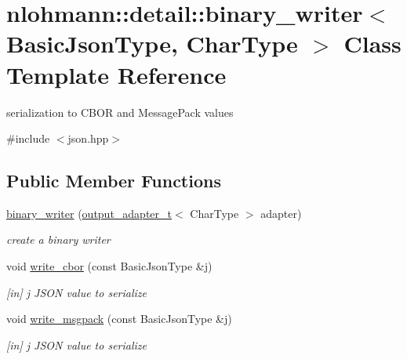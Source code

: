 \hypertarget{classnlohmann_1_1detail_1_1binary__writer}{}\section{nlohmann\+:\+:detail\+:\+:binary\+\_\+writer$<$ Basic\+Json\+Type, Char\+Type $>$ Class Template Reference}
\label{classnlohmann_1_1detail_1_1binary__writer}


serialization to C\+B\+OR and Message\+Pack values  




{\ttfamily \#include $<$json.\+hpp$>$}

\subsection*{Public Member Functions}
\begin{DoxyCompactItemize}
\item 
\hyperlink{classnlohmann_1_1detail_1_1binary__writer_a373289af95a946c19bb4a58a5df71a78}{binary\+\_\+writer} (\hyperlink{namespacenlohmann_1_1detail_a0fd8edff7729aa2dd92b070964bade2e}{output\+\_\+adapter\+\_\+t}$<$ Char\+Type $>$ adapter)
\begin{DoxyCompactList}\small\item\em create a binary writer \end{DoxyCompactList}\item 
void \hyperlink{classnlohmann_1_1detail_1_1binary__writer_aa0ab8d27fd88a33a2f801413ac4c7fbc}{write\+\_\+cbor} (const Basic\+Json\+Type \&j)\hypertarget{classnlohmann_1_1detail_1_1binary__writer_aa0ab8d27fd88a33a2f801413ac4c7fbc}{}\label{classnlohmann_1_1detail_1_1binary__writer_aa0ab8d27fd88a33a2f801413ac4c7fbc}

\begin{DoxyCompactList}\small\item\em \mbox{[}in\mbox{]} j J\+S\+ON value to serialize \end{DoxyCompactList}\item 
void \hyperlink{classnlohmann_1_1detail_1_1binary__writer_ae4e0852b64102ce4b07d99f08f828b7c}{write\+\_\+msgpack} (const Basic\+Json\+Type \&j)\hypertarget{classnlohmann_1_1detail_1_1binary__writer_ae4e0852b64102ce4b07d99f08f828b7c}{}\label{classnlohmann_1_1detail_1_1binary__writer_ae4e0852b64102ce4b07d99f08f828b7c}

\begin{DoxyCompactList}\small\item\em \mbox{[}in\mbox{]} j J\+S\+ON value to serialize \end{DoxyCompactList}\end{DoxyCompactItemize}


